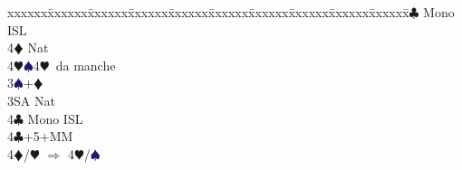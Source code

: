 \documentclass[a4paper,italian]{article}
\newcommand{\BC}{\textcolor{OliveGreen}{$\clubsuit$}}
\newcommand{\BD}{\textcolor{RedOrange}{$\vardiamondsuit$}}
\newcommand{\BH}{\textcolor{Red2}{$\varheartsuit${}}}
\newcommand{\BS}{\textcolor{MidnightBlue}{$\spadesuit${}}}
\newenvironment{bidtable}
{\begin{tabbing}

    xxxxxx\=xxxxxx\=xxxxxx\=xxxxxx\=xxxxxx\=xxxxxx\=xxxxxx\=xxxxxx\=xxxxxx\=xxxxxx\=\kill}
{\end{tabbing} }%
\begin{document}
\begin{multicols}{2}
\begin{bidtable}
                                            4\BC \> Mono ISL\\
                                            4\BD \> Nat\\
                                            4\BH {}\BS 4\BH\ da manche\-\-\\
                                            3\BS {}+\BD \+\\
                                            3SA \> Nat\+\\
                                            4\BC \> Mono ISL\-\-\\
                                            4\BC {}+5+MM\\
                                            4\BD/\BH \> $\Rightarrow$ 4\BH /\BS \-
                                        \end{bidtable}


\end{multicols}
\end{document}
